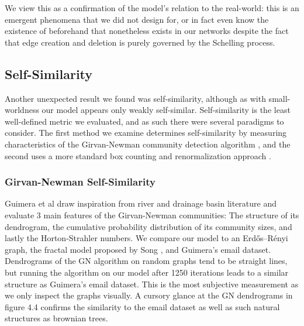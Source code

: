 \documentclass[12pt,twoside]{report}
\begin{document}
We view this as a confirmation of the model's relation to the real-world: this is an emergent phenomena that we did not design for, or in fact even know the existence of beforehand that nonetheless exists in our networks despite the fact that edge creation and deletion is purely governed by the Schelling process. \\

\subsection{Self-Similarity}

Another unexpected result we found was self-similarity, although as with small-worldness our model appears only weakly self-similar. Self-similarity is the least well-defined metric we evaluated, and as such there were several paradigms to consider. The first method we examine determines self-similarity by measuring characteristics of the Girvan-Newman community detection algorithm \cite{guimera2002self}, and the second uses a more standard box counting and renormalization approach \cite{song2007calculate}. \\

\subsubsection{Girvan-Newman Self-Similarity}

Guimera et al \cite{guimera2002self} draw inspiration from river and drainage basin literature and evaluate 3 main features of the Girvan-Newman communities: The structure of its dendrogram, the cumulative probability distribution of its community sizes, and lastly the Horton-Strahler numbers. We compare our model to an Erdős–Rényi graph, the fractal model proposed by Song \cite{song2006origins}, and Guimera's email dataset. \\

Dendrograms of the GN algorithm on random graphs tend to be straight lines, but running the algorithm on our model after 1250 iterations leads to a similar structure as Guimera's email dataset. This is the most subjective measurement as we only inspect the graphs visually. A cursory glance at the GN dendrograms in figure 4.4 confirms the similarity to the email dataset as well as such natural structures as brownian trees. \\
\end{document}
